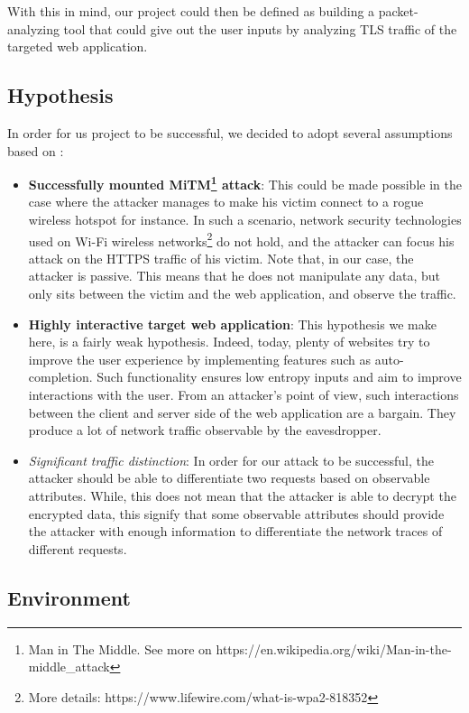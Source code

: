 \documentclass[journal]{IEEEtran}
\begin{document}
With this in mind, our project could then be defined as building a packet-analyzing tool that could give out the user inputs by analyzing TLS traffic of the targeted web application.

\subsection{Hypothesis}

In order for us project to be successful, we decided to adopt several assumptions based on \cite{SCLeaks}:

\begin{itemize}
    \item \textbf{Successfully mounted MiTM\footnote{Man in The Middle. See more on https://en.wikipedia.org/wiki/Man-in-the-middle\_attack} attack}: This could be made possible in the case where the attacker manages to make his victim connect to a rogue wireless hotspot for instance. In such a scenario, network security technologies used on Wi-Fi wireless networks\footnote{More details: https://www.lifewire.com/what-is-wpa2-818352} do not hold, and the attacker can focus his attack on the HTTPS traffic of his victim. Note that, in our case, the attacker is passive. This means that he does not manipulate any data, but only sits between the victim and the web application, and observe the traffic.
    \item \textbf{Highly interactive target web application}: This hypothesis we make here, is a fairly weak hypothesis. Indeed, today, plenty of websites try to improve the user experience by implementing features such as auto-completion. Such functionality ensures low entropy inputs and aim to improve interactions with the user. From an attacker's point of view, such interactions between the client and server side of the web application are a bargain. They produce a lot of network traffic observable by the eavesdropper.
    \item \emph{Significant traffic distinction}: In order for our attack to be successful, the attacker should be able to differentiate two requests based on observable attributes. While, this does not mean that the attacker is able to decrypt the encrypted data, this signify that some observable attributes should provide the attacker with enough information to differentiate the network traces of different requests.
\end{itemize}


\subsection{Environment}
\end{document}
